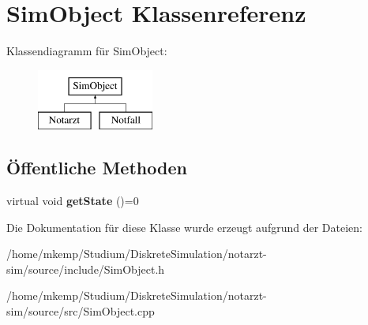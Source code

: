 \hypertarget{classSimObject}{}\section{Sim\+Object Klassenreferenz}
\label{classSimObject}
Klassendiagramm für Sim\+Object\+:\begin{figure}[H]
\begin{center}
\leavevmode
\includegraphics[height=2.000000cm]{classSimObject}
\end{center}
\end{figure}
\subsection*{Öffentliche Methoden}
\begin{DoxyCompactItemize}
\item 
virtual void {\bfseries get\+State} ()=0\hypertarget{classSimObject_a3100e6db6c86456b79351c7e6a62ec65}{}\label{classSimObject_a3100e6db6c86456b79351c7e6a62ec65}

\end{DoxyCompactItemize}


Die Dokumentation für diese Klasse wurde erzeugt aufgrund der Dateien\+:\begin{DoxyCompactItemize}
\item 
/home/mkemp/\+Studium/\+Diskrete\+Simulation/notarzt-\/sim/source/include/Sim\+Object.\+h\item 
/home/mkemp/\+Studium/\+Diskrete\+Simulation/notarzt-\/sim/source/src/Sim\+Object.\+cpp\end{DoxyCompactItemize}
